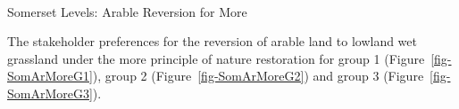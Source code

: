 \documentclass[
  12pt,
  letterpaper,
  DIV=11,
  numbers=noendperiod]{scrartcl}
\makeatletter
\let\oldparagraph\paragraph
\renewcommand{\paragraph}{
    \@ifstar
      \xxxParagraphStar
      \xxxParagraphNoStar
  }
\newcommand{\xxxParagraphStar}[1]{\oldparagraph*{#1}\mbox{}}
\newcommand{\xxxParagraphNoStar}[1]{\oldparagraph{#1}\mbox{}}
\makeatother
\begin{document}
\newpage{}

\paragraph{Somerset Levels: Arable Reversion for
More}\label{somerset-levels-arable-reversion-for-more}

The stakeholder preferences for the reversion of arable land to lowland
wet grassland under the more principle of nature restoration for group 1
(Figure~\ref{fig-SomArMoreG1}), group 2 (Figure~\ref{fig-SomArMoreG2})
and group 3 (Figure~\ref{fig-SomArMoreG3}).

\begin{figure}[H]

\end{figure}
\end{document}
